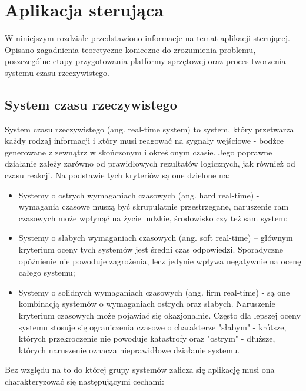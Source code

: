 \chapter{Aplikacja sterująca}
\label{cha:aplikacja_sterujaca}
W niniejszym rozdziale przedstawiono informacje na temat aplikacji sterującej. Opisano zagadnienia teoretyczne konieczne do zrozumienia problemu, poszczególne etapy przygotowania platformy sprzętowej oraz proces tworzenia systemu czasu rzeczywistego.




\section{System czasu rzeczywistego}
System czasu rzeczywistego (ang. real-time system) to system, który przetwarza każdy rodzaj informacji i który musi reagować na sygnały wejściowe - bodźce generowane z zewnątrz w skończonym i określonym czasie. Jego poprawne działanie zależy zarówno od prawidłowych rezultatów logicznych, jak również od czasu reakcji.
Na podstawie tych kryteriów są one dzielone na:
\begin{itemize}
	\item Systemy o ostrych wymaganiach czasowych (ang. hard real-time) - wymagania czasowe muszą być skrupulatnie przestrzegane, naruszenie ram czasowych może wpłynąć na życie ludzkie, środowisko czy też sam system;
 
	\item Systemy o słabych wymaganiach czasowych (ang. soft real-time) – głównym kryterium oceny tych systemów jest średni czas odpowiedzi. Sporadyczne opóźnienie nie powoduje zagrożenia, lecz jedynie wpływa negatywnie na ocenę całego systemu;

	\item Systemy o solidnych wymaganiach czasowych (ang. firm real-time) - są one kombinacją systemów o wymaganiach ostrych oraz słabych. Naruszenie kryterium czasowych może pojawiać się okazjonalnie. Często dla lepszej oceny systemu stosuje się ograniczenia czasowe o charakterze "słabym" - krótsze, których przekroczenie nie powoduje katastrofy oraz "ostrym" - dłuższe, których naruszenie oznacza nieprawidłowe działanie systemu. 

\end{itemize}

Bez względu na to do której grupy systemów zalicza się aplikację musi ona charakteryzować się następującymi cechami:

